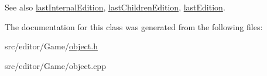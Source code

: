 \begin{DoxySeeAlso}{\-See also}
\hyperlink{class_game_object_a0c4cc65819b30ec36a1c20a1c24997fe}{last\-Internal\-Edition}, \hyperlink{class_game_object_acc65ad08191fcaf558bd1840a45d23cf}{last\-Children\-Edition}, \hyperlink{class_game_object_a73b351287147712a937e87028bf8c876}{last\-Edition}. 
\end{DoxySeeAlso}


\-The documentation for this class was generated from the following files\-:\begin{DoxyCompactItemize}
\item 
src/editor/\-Game/\hyperlink{object_8h}{object.\-h}\item 
src/editor/\-Game/object.\-cpp\end{DoxyCompactItemize}
